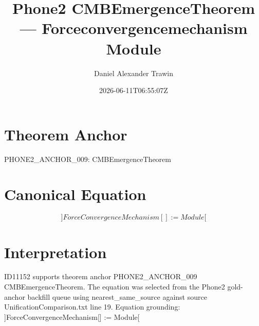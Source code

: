 \documentclass[11pt]{article}
\title{Phone2 CMBEmergenceTheorem — Forceconvergencemechanism Module}
\author{Daniel Alexander Trawin}
\date{2026-06-11T06:55:07Z}
\begin{document}
\maketitle
\section*{Theorem Anchor}
PHONE2_ANCHOR_009: CMBEmergenceTheorem
\section*{Canonical Equation}
\[
]ForceConvergenceMechanism[] := Module[
\]
\section*{Interpretation}
ID11152 supports theorem anchor PHONE2_ANCHOR_009 CMBEmergenceTheorem. The equation was selected from the Phone2 gold-anchor backfill queue using nearest_same_source against source UnificationComparison.txt line 19. Equation grounding: ]ForceConvergenceMechanism[] := Module[
\end{document}
